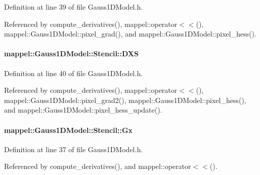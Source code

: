 Definition at line 39 of file Gauss1\+D\+Model.\+h.



Referenced by compute\+\_\+derivatives(), mappel\+::operator$<$$<$(), mappel\+::\+Gauss1\+D\+Model\+::pixel\+\_\+grad(), and mappel\+::\+Gauss1\+D\+Model\+::pixel\+\_\+hess().

\paragraph[{\texorpdfstring{D\+XS}{DXS}}]{ mappel\+::\+Gauss1\+D\+Model\+::\+Stencil\+::\+D\+XS}\hypertarget{classmappel_1_1Gauss1DModel_1_1Stencil_aa8eaf4d165d0b19f9e4c44a60b066e54}{}\label{classmappel_1_1Gauss1DModel_1_1Stencil_aa8eaf4d165d0b19f9e4c44a60b066e54}


Definition at line 40 of file Gauss1\+D\+Model.\+h.



Referenced by compute\+\_\+derivatives(), mappel\+::operator$<$$<$(), mappel\+::\+Gauss1\+D\+Model\+::pixel\+\_\+grad2(), mappel\+::\+Gauss1\+D\+Model\+::pixel\+\_\+hess(), and mappel\+::\+Gauss1\+D\+Model\+::pixel\+\_\+hess\+\_\+update().

\paragraph[{\texorpdfstring{Gx}{Gx}}]{ mappel\+::\+Gauss1\+D\+Model\+::\+Stencil\+::\+Gx}\hypertarget{classmappel_1_1Gauss1DModel_1_1Stencil_af526cf4c9b59b898727d741f692970e8}{}\label{classmappel_1_1Gauss1DModel_1_1Stencil_af526cf4c9b59b898727d741f692970e8}


Definition at line 37 of file Gauss1\+D\+Model.\+h.



Referenced by compute\+\_\+derivatives(), and mappel\+::operator$<$$<$().


